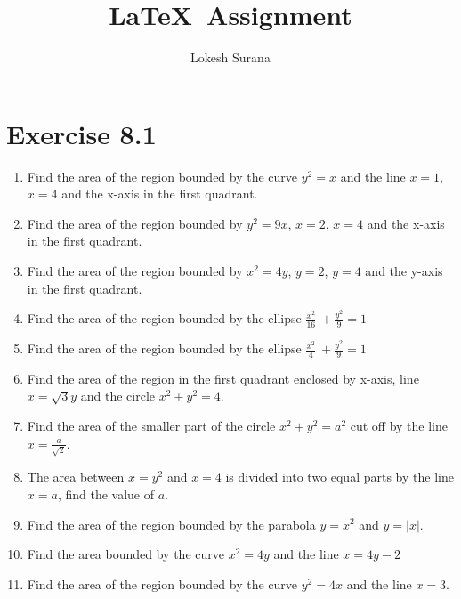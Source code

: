 \documentclass[journal,12pt,twocolumn]{IEEEtran}
\begin{document}
\vspace{3cm}
\title{\LaTeX\ Assignment}
\author{Lokesh Surana}
\maketitle
\section*{Exercise 8.1}
\begin{enumerate}[itemsep=+2mm]
\item Find the area of the region bounded by the curve ${y}^2 = x$ and the line ${x = 1}$, ${x} = 4$ and the x-axis in the first quadrant.

\item Find the area of the region bounded by ${y}^2
= 9{x}$, ${x} = 2$, ${x} = 4$ and the x-axis in the
first quadrant.

\item Find the area of the region bounded by ${x}^2
= 4{y}$, ${y} = 2$, ${y} = 4$ and the y-axis in the
first quadrant.

\item Find the area of the region bounded by the ellipse \(\frac{{x}^2}{16}\ + \frac{{y}^2}{9} = 1\)

\item Find the area of the region bounded by the ellipse \(\frac{{x}^2}{4}\ + \frac{{y}^2}{9} = 1\)

\item Find the area of the region in the first quadrant enclosed by x-axis, line ${x} = \sqrt{3} y$ and the circle ${x}^2 + {y}^2
 = 4$.

\item Find the area of the smaller part of the circle ${x}^2 + {y}^2 = {a}^2$ cut off by the line ${x} = \frac{a}{\sqrt{2}}$.

\item The area between ${x} = {y}^2$ and ${x} = 4$ is divided into two equal parts by the line ${x} = {a}$, find the value of ${a}$.

\item Find the area of the region bounded by the parabola ${y} = {x}^2$ and ${y} = |{x}|$.

\item Find the area bounded by the curve ${x}^2 = 4{y}$ and the line ${x} = 4{y} - 2$

\item Find the area of the region bounded by the curve ${y}^2
= 4{x}$ and the line ${x} = 3$.

\end{enumerate}
\end{document}
